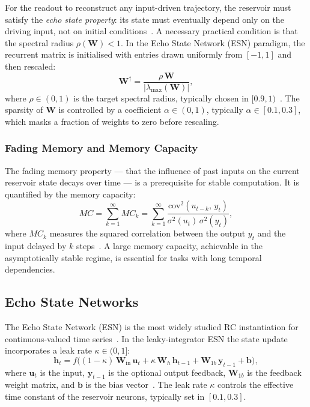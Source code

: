 \documentclass[11pt, oneside]{article}
\begin{document}
For the readout to reconstruct any input-driven trajectory, the reservoir
must satisfy the \emph{echo state property}: its state must eventually depend
only on the driving input, not on initial conditions~\autocite{Jaeger2001}.
A necessary practical condition is that the spectral radius
\(\rho(\mathbf{W}) < 1\).
In the Echo State Network (ESN) paradigm, the recurrent matrix is
initialised with entries drawn uniformly from \([-1, 1]\) and then rescaled:
\begin{equation}
  \mathbf{W}^{\dagger}
  = \frac{\rho\,\mathbf{W}}{|\lambda_{\max}(\mathbf{W})|},
  \label{eq:spectral_scaling}
\end{equation}
where \(\rho \in (0,1)\) is the target spectral radius, typically chosen in
\([0.9, 1)\)~\autocite{Bai2023}.
The sparsity of \(\mathbf{W}\) is controlled by a coefficient
\(\alpha \in (0,1)\), typically \(\alpha \in [0.1, 0.3]\), which masks a
fraction of weights to zero before rescaling.
 
\subsubsection{Fading Memory and Memory Capacity}
 
The fading memory property --- that the influence of past inputs on the
current reservoir state decays over time --- is a prerequisite for stable
computation.
It is quantified by the memory capacity:
\begin{equation}
  MC = \sum_{k=1}^{\infty} MC_k
     = \sum_{k=1}^{\infty}
       \frac{\mathrm{cov}^2(u_{t-k},\,y_t)}
            {\sigma^2(u_t)\,\sigma^2(y_t)},
  \label{eq:mc}
\end{equation}
where \(MC_k\) measures the squared correlation between the output \(y_t\) and
the input delayed by \(k\) steps~\autocite{Jaeger2001}.
A large memory capacity, achievable in the asymptotically stable regime,
is essential for tasks with long temporal dependencies.
 
\subsection{Echo State Networks}
 
The Echo State Network (ESN) is the most widely studied RC instantiation for
continuous-valued time series~\autocite{Jaeger2004}.
In the leaky-integrator ESN the state update incorporates a leak rate
\(\kappa \in (0,1]\):
\begin{equation}
  \mathbf{h}_t = f\!\bigl(
    (1-\kappa)\,\mathbf{W}_{\mathrm{in}}\,\mathbf{u}_t
    + \kappa\,\mathbf{W}_h\,\mathbf{h}_{t-1}
    + \mathbf{W}_{1b}\,\mathbf{y}_{t-1}
    + \mathbf{b}
  \bigr),
  \label{eq:esn}
\end{equation}
where \(\mathbf{u}_t\) is the input, \(\mathbf{y}_{t-1}\) is the optional
output feedback, \(\mathbf{W}_{1b}\) is the feedback weight matrix,
and \(\mathbf{b}\) is the bias vector~\autocite{Bai2023}.
The leak rate \(\kappa\) controls the effective time constant of the reservoir
neurons, typically set in \([0.1, 0.3]\).
 
\end{document}
